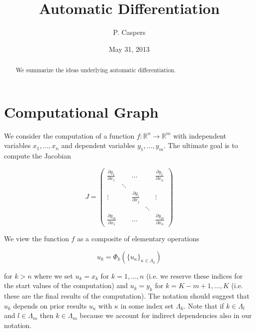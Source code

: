 \documentclass{amsart}
\theoremstyle{plain}
\numberwithin{equation}{section}
\begin{document}
\title[AD]{Automatic Differentiation}
\author{P. Caspers}
\date{May 31, 2013}
\begin{abstract}
We summarize the ideas underlying automatic differentiation.
\end{abstract}

\maketitle

\tableofcontents

\section{Computational Graph}

We consider the computation of a function $f: \mathbb{R}^n \rightarrow \mathbb{R}^m$ with independent variables $x_1, \dots , x_n$ and dependent variables $y_1, \dots , y_m$. The ultimate goal is to compute the Jacobian

\begin{equation}
J = \begin{pmatrix}
\frac{\partial y_1}{\partial x_1} &  & \dots &  & \frac{\partial y_1}{\partial x_n} \\
 & \ddots & & & \\
\vdots &  & \frac{\partial y_i}{\partial x_j} &  & \vdots \\
 &  &                                   & \ddots & \\
\frac{\partial y_m}{\partial x_1} & & \dots & & \frac{\partial y_m}{\partial x_n}
\end{pmatrix}
\end{equation}

We view the function $f$ as a composite of elementary operations

\begin{equation}
u_k = \Phi_k( \{u_\kappa\}_{\kappa \in \Lambda_k})
\end{equation}

for $k > n$ where we set $u_k = x_k$ for $k=1,\dots,n$ (i.e. we reserve these indices for the start values of the computation) and $u_k = y_k$ for $k=K-m+1, \dots, K$ (i.e. these are the final results of the computation). The notation should suggest that $u_k$ depends on prior results $u_\kappa$ with $\kappa$ in some index set $\Lambda_k$. Note that if $k\in\Lambda_l$ and $l\in\Lambda_m$ then $k\in\Lambda_m$ because we account for indirect dependencies also in our notation.
\end{document}
